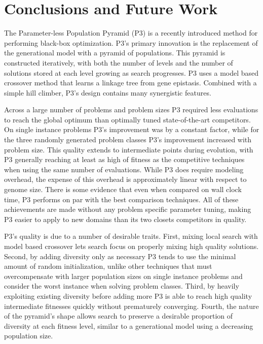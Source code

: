 \chapter{Conclusions and Future Work}
The Parameter-less Population Pyramid (P3) is a recently introduced method for performing black-box
optimization. P3's primary innovation is the replacement of the generational model with a pyramid of populations.
This pyramid is constructed iteratively, with both the number of levels and the number of solutions stored
at each level growing as search progresses. P3 uses a model based crossover method
that learns a linkage tree from gene epistasis. Combined with a simple hill climber, P3's design contains
many synergistic features.

Across a large number of problems and problem sizes P3 required less evaluations to reach the global optimum
than optimally tuned state-of-the-art competitors. On single instance problems P3's improvement was by a
constant factor, while for the three randomly generated problem classes P3's improvement increased with problem size. This
quality extends to intermediate points during evolution, with P3 generally reaching at least as high
of fitness as the competitive techniques when using the same number of evaluations. While P3 does require
modeling overhead, the expense of this overhead is approximately linear with respect to genome size. There
is some evidence that even when compared on wall clock time, P3 performs on par with
the best comparison techniques. All of these achievements are made without any problem specific parameter
tuning, making P3 easier to apply to new domains than its two closets competitors in quality.

P3's quality is due to a number of desirable traits. First, mixing local search with model based
crossover lets search focus on properly mixing high quality solutions. Second, by adding diversity only
as necessary P3 tends to use the minimal amount of random initialization, unlike other techniques that must
overcompensate with larger population sizes on single instance problems and consider the worst instance
when solving problem classes. Third, by heavily exploiting existing diversity before adding more P3 is able
to reach high quality intermediate fitnesses quickly without prematurely converging. Fourth, the
nature of the pyramid's shape allows search to preserve a desirable proportion of diversity at
each fitness level, similar to a generational model using a decreasing population size.

